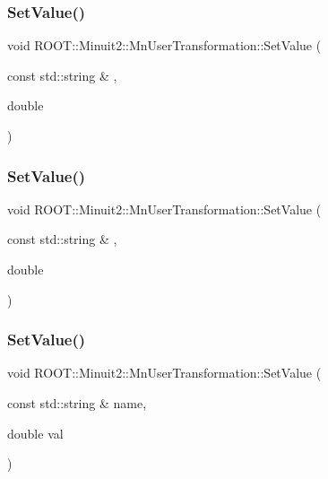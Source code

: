 \subsubsection{\texorpdfstring{SetValue()}{SetValue()}\hspace{0.1cm}{\footnotesize\ttfamily [4/6]}}
{\footnotesize\ttfamily void R\+O\+O\+T\+::\+Minuit2\+::\+Mn\+User\+Transformation\+::\+Set\+Value (\begin{DoxyParamCaption}\item[{const std\+::string \&}]{,  }\item[{double}]{ }\end{DoxyParamCaption})}

\mbox{\label{classROOT_1_1Minuit2_1_1MnUserTransformation_a30717c0bcc5206cc957e505b9cfd64fd}} 
\subsubsection{\texorpdfstring{SetValue()}{SetValue()}\hspace{0.1cm}{\footnotesize\ttfamily [5/6]}}
{\footnotesize\ttfamily void R\+O\+O\+T\+::\+Minuit2\+::\+Mn\+User\+Transformation\+::\+Set\+Value (\begin{DoxyParamCaption}\item[{const std\+::string \&}]{,  }\item[{double}]{ }\end{DoxyParamCaption})}

\mbox{\label{classROOT_1_1Minuit2_1_1MnUserTransformation_a30717c0bcc5206cc957e505b9cfd64fd}} 
\subsubsection{\texorpdfstring{SetValue()}{SetValue()}\hspace{0.1cm}{\footnotesize\ttfamily [6/6]}}
{\footnotesize\ttfamily void R\+O\+O\+T\+::\+Minuit2\+::\+Mn\+User\+Transformation\+::\+Set\+Value (\begin{DoxyParamCaption}\item[{const std\+::string \&}]{name,  }\item[{double}]{val }\end{DoxyParamCaption})}

